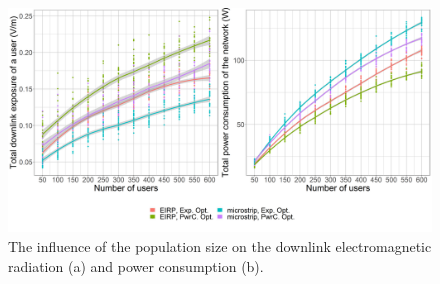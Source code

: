 \documentclass[twocolumn]{phdsymp} %
\begin{document}
\begin{figure}[h!]
  \includegraphics[width=\linewidth]{../results/s3/uvsdlAndPc.png}
  \caption{The influence of the population size on the downlink electromagnetic radiation (a) and power consumption (b).}
  \label{fig:s3b_dlAndPC}
\end{figure}
\end{document}
